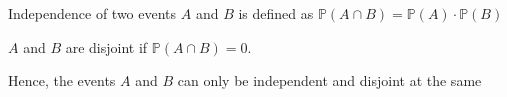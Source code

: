 \documentclass{article}
\begin{document}
Independence of two events $A$ and $B$ is defined as $\mathbb{P}(A \cap B) = \mathbb{P}(A) \cdot \mathbb{P}(B)$

$A$ and $B$ are disjoint if $\mathbb{P}(A \cap B) = 0$.

Hence, the events $A$ and $B$ can only be independent and disjoint at the same
\end{document}
